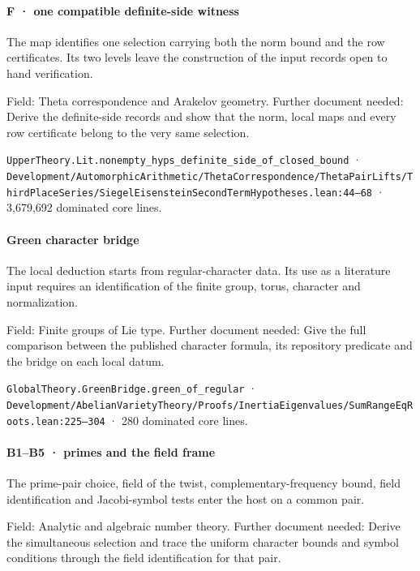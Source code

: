 \paragraph{F · one compatible definite-side witness}

The map identifies one selection carrying both the norm bound and the row certificates. Its two levels leave the construction of the input records open to hand verification.

Field: Theta correspondence and Arakelov geometry. Further document needed: Derive the definite-side records and show that the norm, local maps and every row certificate belong to the very same selection.

\nolinkurl{UpperTheory.Lit.nonempty_hyps_definite_side_of_closed_bound} · \nolinkurl{Development/AutomorphicArithmetic/ThetaCorrespondence/ThetaPairLifts/ThirdPlaceSeries/SiegelEisensteinSecondTermHypotheses.lean:44–68} · 3,679,692 dominated core lines.

\paragraph{Green character bridge}

The local deduction starts from regular-character data. Its use as a literature input requires an identification of the finite group, torus, character and normalization.

Field: Finite groups of Lie type. Further document needed: Give the full comparison between the published character formula, its repository predicate and the bridge on each local datum.

\nolinkurl{GlobalTheory.GreenBridge.green_of_regular} · \nolinkurl{Development/AbelianVarietyTheory/Proofs/InertiaEigenvalues/SumRangeEqRoots.lean:225–304} · 280 dominated core lines.

\paragraph{B1–B5 · primes and the field frame}

The prime-pair choice, field of the twist, complementary-frequency bound, field identification and Jacobi-symbol tests enter the host on a common pair.

Field: Analytic and algebraic number theory. Further document needed: Derive the simultaneous selection and trace the uniform character bounds and symbol conditions through the field identification for that pair.

